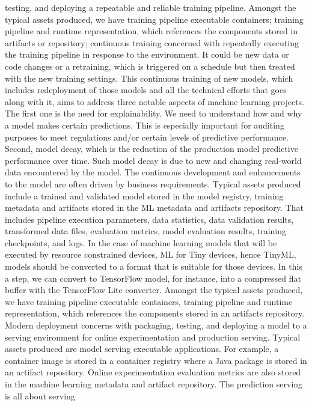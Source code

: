 testing, and deploying a repeatable and reliable training pipeline.
Amongst the typical assets produced, we have training pipeline executable
containers; training pipeline and runtime representation, which
references the components stored in artifacts or repository;
continuous training concerned with repeatedly
executing the training pipeline in response to the environment.
It could be new data or code changes or a retraining,
which is triggered on a schedule but then treated
with the new training settings.
This continuous training of new models, which
includes redeployment of those models and all the technical efforts
that goes along with it, aims to address three notable aspects
of machine learning projects.
The first one is the need for explainability.
We need to understand how and why a model makes certain predictions.
This is especially important for auditing purposes
to meet regulations and/or certain levels of predictive performance.
Second, model decay, which is the reduction of the production
model predictive performance over time.
Such model decay is due to new and changing real-world data encountered
by the model.
The continuous development and enhancements to the model
are often driven by business requirements.
Typical assets produced include a trained and validated model
stored in the model registry, training metadata
and artifacts stored in the ML metadata and artifacts repository.
That includes pipeline execution parameters, data statistics,
data validation results, transformed data files, evaluation metrics,
model evaluation results, training checkpoints, and logs.
In the case of machine learning models that
will be executed by resource constrained devices, ML for Tiny devices, hence
TinyML, models should be converted to a format that
is suitable for those devices.
In this a step, we can convert to TensorFlow model,
for instance, into a compressed flat buffer with the TensorFlow Lite
converter.
Amongst the typical assets produced, we have training pipeline executable
containers, training pipeline and runtime representation,
which references the components stored in an artifacts repository.
Modern deployment concerns with packaging, testing,
and deploying a model to a serving environment for online experimentation
and production serving.
Typical assets produced are model serving executable applications.
For example, a container image is stored in a container registry
where a Java package is stored in an artifact repository.
Online experimentation evaluation metrics
are also stored in the machine learning metadata and artifact repository.
The prediction serving is all about serving
